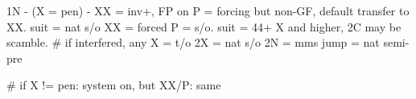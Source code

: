 1N - (X = pen) -
XX = inv+, FP on
P = forcing but non-GF, default transfer to XX.
    suit = nat s/o
    XX = forced
        P = s/o. suit = 44+ X and higher, 2C may be scamble.
    # if interfered, any X = t/o
2X = nat s/o
2N = mms
jump = nat semi-pre

# if X != pen:
system on, but XX/P: same